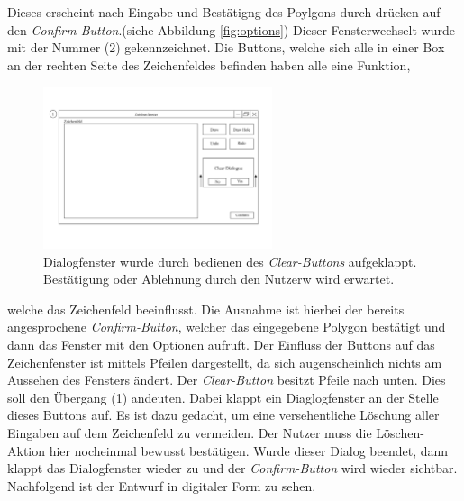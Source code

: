Dieses erscheint nach Eingabe und Bestätigng des Poylgons durch drücken auf den \emph{Confirm-Button}.(siehe Abbildung \ref{fig:options}) Dieser Fensterwechselt wurde mit der Nummer (2) gekennzeichnet. Die Buttons, welche sich alle in einer Box an der rechten Seite des Zeichenfeldes befinden haben alle eine Funktion,
\begin{figure}
    \centering
    \includegraphics[width=0.6\textwidth]{bilder/cleardialogue.png}
    \caption[Öffnung des Dialogfensters]{Dialogfenster wurde durch bedienen des \emph{Clear-Buttons} aufgeklappt. Bestätigung oder Ablehnung durch den Nutzerw wird erwartet.}
    \label{fig:cleardia}
\end{figure}
welche das Zeichenfeld beeinflusst. 
Die Ausnahme ist hierbei der bereits angesprochene \emph{Confirm-Button}, welcher das eingegebene Polygon bestätigt und dann das Fenster mit den Optionen aufruft.
Der Einfluss der Buttons auf das Zeichenfenster ist mittels Pfeilen dargestellt, da sich augenscheinlich nichts am Aussehen des Fensters ändert.
Der \emph{Clear-Button} besitzt Pfeile nach unten. Dies soll den Übergang (1) andeuten. Dabei klappt ein Diaglogfenster an der Stelle dieses Buttons auf. Es ist dazu gedacht, um eine versehentliche Löschung aller Eingaben auf dem Zeichenfeld zu vermeiden.
Der Nutzer muss die Löschen-Aktion hier nocheinmal bewusst bestätigen. Wurde dieser Dialog beendet, dann klappt das Dialogfenster wieder zu und der  \emph{Confirm-Button} wird wieder sichtbar. Nachfolgend ist der Entwurf in digitaler Form zu sehen.    
